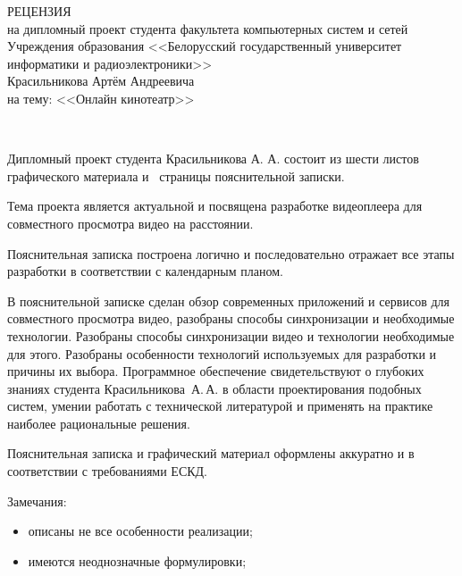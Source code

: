  
\thispagestyle{empty}
 
\begin{singlespace}
 
{\small
 \begin{center}
   \begin{minipage}{0.9\textwidth}
     \begin{center}
       {\normalsize РЕЦЕНЗИЯ}\\[0.2cm]
       на дипломный проект студента факультета компьютерных систем и сетей Учреждения образования <<Белорусский государственный университет информатики и радиоэлектроники>>\\
       Красильникова Артём Андреевича \\
       на тему: <<Онлайн кинотеатр>>
     \end{center}
   \end{minipage}\\
 \end{center}
 
Дипломный проект студента Красильникова А. А. состоит из шести листов графического материала и~\pageref*{LastPage} страницы пояснительной записки.
 
Тема проекта является актуальной и посвящена разработке видеоплеера для совместного просмотра видео на расстоянии.
 
Пояснительная записка построена логично и последовательно отражает все этапы разработки в соответствии с календарным планом.
 
В пояснительной записке сделан обзор современных приложений и сервисов для совместного просмотра видео, разобраны способы синхронизации и необходимые технологии.
Разобраны способы синхронизации видео и технологии необходимые для этого.
Разобраны особенности технологий используемых для разработки и причины их выбора.
Программное обеспечение свидетельствуют о глубоких знаниях студента Красильникова~А.\,А. в области проектирования подобных систем, умении работать с технической литературой и применять на практике наиболее рациональные решения.
 
Пояснительная записка и графический материал оформлены аккуратно и в соответствии с требованиями ЕСКД.
 
Замечания:
\begin{itemize}
 \item описаны не все особенности реализации;
 \item имеются неоднозначные формулировки;
\end{itemize}
 
}
\end{singlespace}
